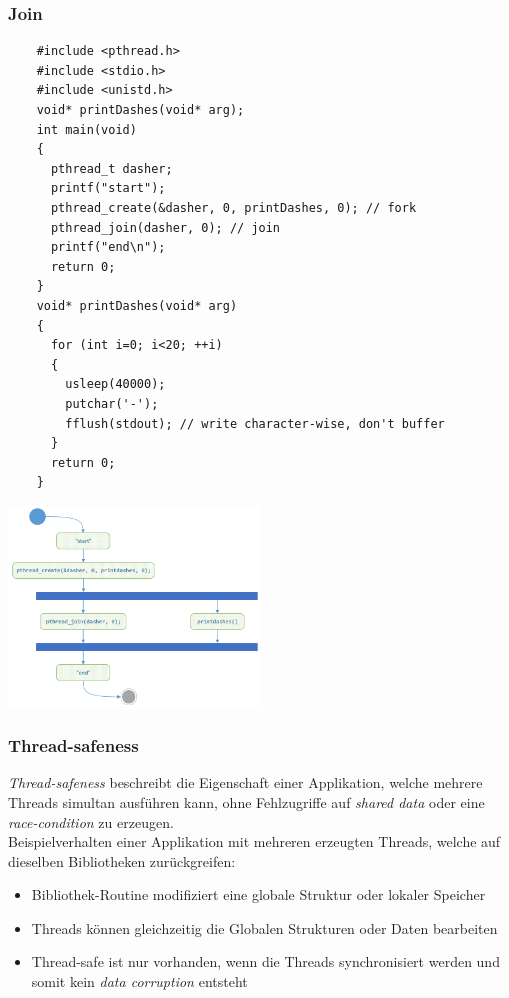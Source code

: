 \newpage

\subsubsection{Join}
\begin{multicols}{2}
  \begin{lstlisting}
    #include <pthread.h>
    #include <stdio.h>
    #include <unistd.h>
    void* printDashes(void* arg);
    int main(void)
    {
      pthread_t dasher;
      printf("start");
      pthread_create(&dasher, 0, printDashes, 0); // fork
      pthread_join(dasher, 0); // join
      printf("end\n");
      return 0;
    }
    void* printDashes(void* arg)
    {
      for (int i=0; i<20; ++i)
      {
        usleep(40000);
        putchar('-');
        fflush(stdout); // write character-wise, don't buffer
      }
      return 0;
    }
    \end{lstlisting}
\vfill\null
\columnbreak
\includegraphics[width=0.5\textwidth]{images/Concurrency/pthreadJoin.png}
\end{multicols}

\subsubsection{Thread-safeness}
\textit{Thread-safeness} beschreibt die Eigenschaft einer Applikation, welche mehrere Threads 
simultan ausführen kann, ohne Fehlzugriffe auf \textit{shared data} oder eine \textit{race-condition} zu erzeugen.\\
Beispielverhalten einer Applikation mit mehreren erzeugten Threads, welche auf dieselben Bibliotheken zurückgreifen:
\begin{itemize}
  \item Bibliothek-Routine modifiziert eine globale Struktur oder lokaler Speicher
  \item Threads können gleichzeitig die Globalen Strukturen oder Daten bearbeiten
  \item Thread-safe ist nur vorhanden, wenn die Threads synchronisiert werden und somit kein \textit{data corruption} entsteht
\end{itemize}

